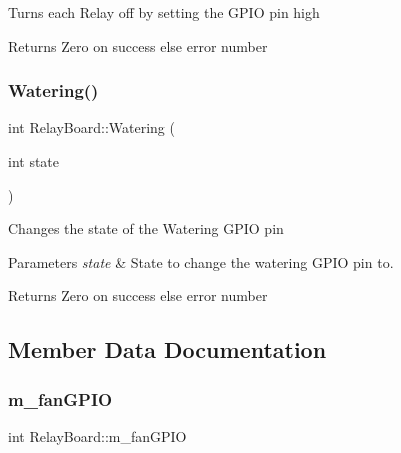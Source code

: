 Turns each Relay off by setting the G\+P\+IO pin high

\begin{DoxyReturn}{Returns}
Zero on success else error number 
\end{DoxyReturn}
\mbox{\label{classRelayBoard_ab9e7c87d94483e55053722ff0981ff8f}} 
\subsubsection{\texorpdfstring{Watering()}{Watering()}}
{\footnotesize\ttfamily int Relay\+Board\+::\+Watering (\begin{DoxyParamCaption}\item[{int}]{state }\end{DoxyParamCaption})}

Changes the state of the Watering G\+P\+IO pin


\begin{DoxyParams}{Parameters}
{\em state} & State to change the watering G\+P\+IO pin to.\\
\hline
\end{DoxyParams}
\begin{DoxyReturn}{Returns}
Zero on success else error number 
\end{DoxyReturn}


\subsection{Member Data Documentation}
\mbox{\label{classRelayBoard_af541df432f4ef6b385ee2e69c466b344}} 
\subsubsection{\texorpdfstring{m\+\_\+fan\+G\+P\+IO}{m\_fanGPIO}}
{\footnotesize\ttfamily int Relay\+Board\+::m\+\_\+fan\+G\+P\+IO\hspace{0.3cm}{\ttfamily [private]}}

\mbox{\label{classRelayBoard_a1522a4a160fe47ecd96adf81ba372c98}} 

